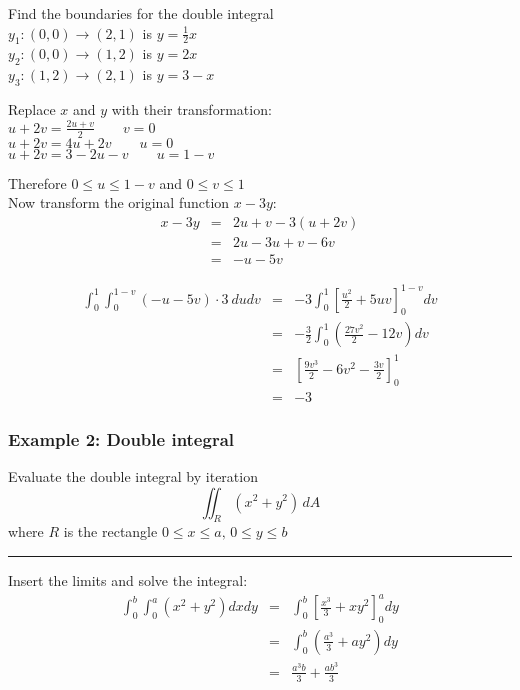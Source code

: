 Find the boundaries for the double integral\\
$y_1: (0,0) \to (2,1)$ is $y=\frac{1}{2}x$\\
$y_2: (0,0) \to (1,2)$ is $y=2x$\\
$y_3: (1,2) \to (2,1)$ is $y=3-x$

Replace $x$ and $y$ with their transformation:\\
$u+2v=\frac{2u+v}{2}\qquad v=0$\\
$u+2v=4u+2v\qquad u=0$\\
$u+2v=3-2u-v\qquad u=1-v$

Therefore $0\leq u\leq 1-v$ and $0\leq v\leq 1$\\
Now transform the original function $x-3y$:
\begin{eqnarray*}
  x-3y&=&2u+v-3(u+2v)\\
      &=&2u-3u+v-6v\\
      &=&-u-5v
\end{eqnarray*}

\begin{eqnarray*}
  \int_{0}^{1}\int_{0}^{1-v}(-u-5v)\cdot3\ dudv&=&-3 \int_{0}^{1} \left[\frac{u^2}{2}+5 u v\right]^{1-v}_0dv\\
                                               &=&-\frac{3}{2}\int_0^1\left(\frac{27 v^2}{2}-12 v\right)dv\\
                                               &=&\left[\frac{9 v^3}{2}-6 v^2-\frac{3 v}{2}\right]_0^1\\
                                               &=&\boxed{-3}
\end{eqnarray*}
\subsubsection{Example 2: Double integral}
Evaluate the double integral by iteration
$$\iint_{R}(x^{2}+y^{2})\,d A$$
where $R$ is the rectangle $0\leq x\leq a,\,0\leq y\leq b$

\rule{\textwidth}{0.5pt}

Insert the limits and solve the integral:
\begin{eqnarray*}
  \int_{0}^{b}\int_{0}^{a}(x^2+y^2)dxdy&=&\int_{0}^{b}\left[\frac{x^3}{3}+x y^2\right]^a_0dy\\
                                       &=&\int_{0}^{b}\left(\frac{a^3}{3}+a y^2\right)dy\\
                                       &=&\boxed{\frac{a^3 b}{3}+\frac{a b^3}{3}}
\end{eqnarray*}

